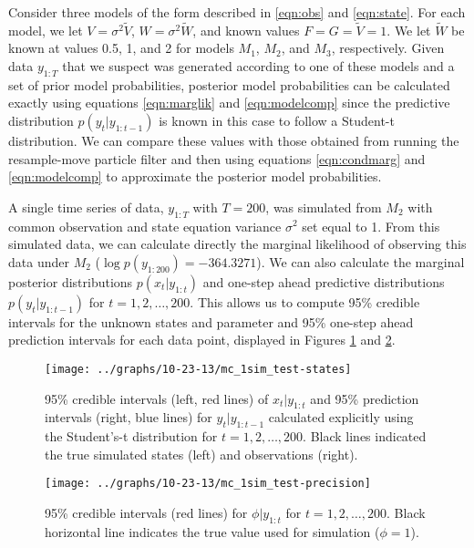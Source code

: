 \documentclass{article}
\begin{document}
Consider three models of the form described in \eqref{eqn:obs} and \eqref{eqn:state}. For each model, we let $V = \sigma^2\tilde{V}$, $W = \sigma^2\tilde{W}$, and known values $F = G = \tilde{V} = 1$. We let $\tilde{W}$ be known at values 0.5, 1, and 2 for models $M_1$, $M_2$, and $M_3$, respectively. Given data $y_{1:T}$ that we suspect was generated according to one of these models and a set of prior model probabilities, posterior model probabilities can be calculated exactly using equations \eqref{eqn:marglik} and \eqref{eqn:modelcomp} since the predictive distribution $p(y_t|y_{1:t-1})$ is known in this case to follow a Student-t distribution. We can compare these values with those obtained from running the resample-move particle filter and then using equations \eqref{eqn:condmarg} and \eqref{eqn:modelcomp} to approximate the posterior model probabilities.

A single time series of data, $y_{1:T}$ with $T = 200$, was simulated from $M_2$ with common observation and state equation variance $\sigma^2$ set equal to 1. From this simulated data, we can calculate directly the marginal likelihood of observing this data under $M_2$ ($\log p(y_{1:200}) = -364.3271$). We can also calculate the marginal posterior distributions $p(x_t|y_{1:t})$ and one-step ahead predictive distributions $p(y_t|y_{1:t-1})$ for $t = 1,2,\ldots,200$. This allows us to compute 95\% credible intervals for the unknown states and parameter and 95\% one-step ahead prediction intervals for each data point, displayed in Figures \ref{fig:sim-states} and \ref{fig:sim-precision}.

\begin{figure}
\texttt{[image: ../graphs/10-23-13/mc\_1sim\_test-states]}
\caption{95\% credible intervals (left, red lines) of $x_t|y_{1:t}$ and 95\% prediction intervals (right, blue lines) for $y_t|y_{1:t-1}$ calculated explicitly using the Student's-t distribution for $t = 1,2,\ldots,200$. Black lines indicated the true simulated states (left) and observations (right).} \label{fig:sim-states}
\end{figure}

\begin{figure}
\texttt{[image: ../graphs/10-23-13/mc\_1sim\_test-precision]}
\caption{95\% credible intervals (red lines) for $\phi|y_{1:t}$ for $t = 1, 2, \ldots, 200$. Black horizontal line indicates the true value used for simulation ($\phi = 1$).} \label{fig:sim-precision}
\end{figure}
\end{document}
